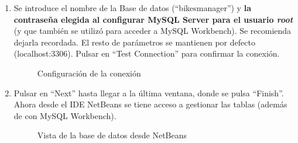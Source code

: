 \begin{enumerate}
	\FloatBarrier
	\item Se introduce el nombre de la Base de datos (``bikesmanager'') y \textbf{la contraseña elegida al configurar MySQL Server para el usuario \emph{root}} (y que también se utilizó para acceder a MySQL Workbench). Se recomienda dejarla recordada. El resto de parámetros se mantienen por defecto (localhost:3306). Pulsar en ``Test Connection'' para confirmar la conexión.
	\begin{figure} [!htb]
		\centering
		\caption{Configuración de la conexión}
		\label{fig:server_2}
	\end{figure}
	\FloatBarrier
	\item Pulsar en ``Next'' hasta llegar a la última ventana, donde se pulsa ``Finish''. Ahora desde el IDE NetBeans se tiene acceso a gestionar las tablas (además de con MySQL Workbench).
	\begin{figure} [!htb]
		\centering
		\caption{Vista de la base de datos desde NetBeans}

\end{figure}
\end{enumerate}

